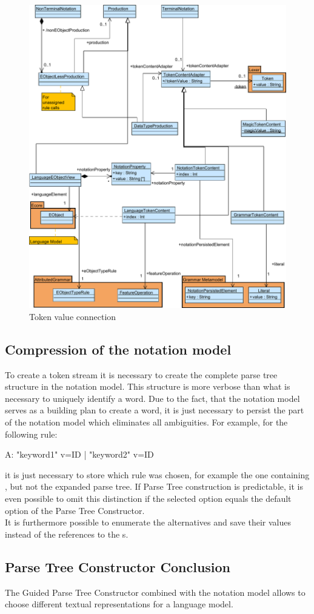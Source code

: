 \begin{figure}
\centering
\includegraphics[scale=0.68]{gfx/ex/Notation_DataLink} 
\caption{Token value connection}
\label{MM:Not:DataLink}
\end{figure}

\subsection{Compression of the notation model}
To create a token stream it is necessary to create the complete parse tree structure in the notation model. This structure is more verbose than what is necessary to uniquely identify a word. Due to the fact, that the notation model serves as a building plan to create a word, it is just necessary to persist the part of the notation model which eliminates all ambiguities. For example, for the following rule:
\begin{xtxt}
A:  "keyword1" v=ID 
 |  "keyword2" v=ID
\end{xtxt}
it is just necessary to store which rule was chosen, for example the one containing , but not the expanded parse tree. If Parse Tree construction is predictable, it is even possible to omit this distinction if the selected option equals the default option of the Parse Tree Constructor.  \\
It is furthermore possible to enumerate the alternatives and save their values instead of the references to the s.

\subsection{Parse Tree Constructor Conclusion}
The Guided Parse Tree Constructor combined with the notation model allows to choose different textual representations for a language model. 



